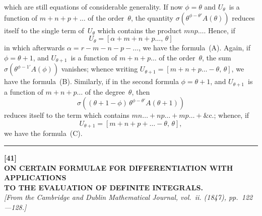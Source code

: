 \documentclass[11pt,a4paper]{article}
\begin{document}
\newpage
which are still equations of considerable generality. If now $\phi = \theta$ and $U_\theta$~is a function of $m+n+p+\ldots$ of the order~$\theta$, the quantity $\sigma\left(\theta^{\phi-\theta'} A(\theta)\right)$ reduces itself to the single term of~$U_\theta$ which contains the product $mnp\ldots$. Hence, if
\[
U_\theta = [\alpha + m+n+p\ldots,\,\theta]
\]
in which afterwards $\alpha = r-m-n-p-\ldots$, we have the formula~(A). Again, if $\phi = \theta+1$, and $U_{\theta+1}$~is a function of $m+n+p\ldots$ of the order~$\theta$, the sum $\sigma\left(\theta^{\phi-1'} A(\phi)\right)$ vanishes; whence writing $U_{\theta+1} = [m+n+p\ldots - \theta,\,\theta]$, we have the formula~(B). Similarly, if in the second formula $\phi = \theta+1$, and $U_{\theta+1}$~is a function of $m+n+p\ldots$ of the degree~$\theta$, then
\[
\sigma\left((\theta+1-\phi)\,\theta^{\phi-\theta'} A(\theta+1)\right)
\]
reduces itself to the term which contains $mn\ldots + np\ldots + mp\ldots + \text{\&c.}$; whence, if
\[
U_{\theta+1} = [m+n+p+\ldots - \theta,\,\theta],
\]
we have the formula~(C).

\vspace{20pt}
\begin{center}
\rule{0.5\textwidth}{0.4pt}
\end{center}


\newpage
\begin{center}
\textbf{[41]}\\[4pt]
\textbf{\large ON CERTAIN FORMULAE FOR DIFFERENTIATION WITH APPLICATIONS\\TO THE EVALUATION OF DEFINITE INTEGRALS.}\\[4pt]
\textit{[From the Cambridge and Dublin Mathematical Journal, vol.~ii. (1847), pp.~122---128.]}
\end{center}

\vspace{6pt}
\end{document}
